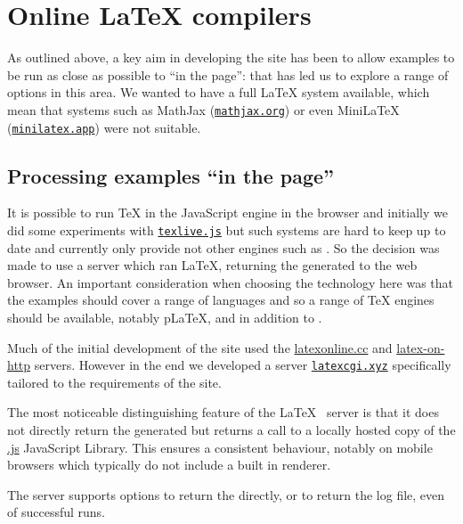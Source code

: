 \documentclass[harvardcite]{ltugboat}
\begin{document}
\section{Online \LaTeX{} compilers}

As outlined above, a key aim in developing the site has been to allow examples
to be run as close as possible to \enquote{in the page}: that has led us to
explore a range of options in this area. We wanted to have a full \LaTeX{}
system available, which mean that systems such as MathJax (\href{https://mathjax.org}{\nolinkurl{mathjax.org}})
or even Mini\LaTeX{} (\href{https://minilatex.app}{\nolinkurl{minilatex.app}}) were not suitable.

\subsection{Processing examples \enquote{in the page}}

It is possible to run \TeX{} in the JavaScript engine in the browser and
initially we did some experiments with
\href{https://github.com/manuels/texlive.js/}{\texttt{texlive.js}} but
such systems are hard to keep up to date and currently only provide
 not other engines such as . So the decision was
made to use a server which ran \LaTeX{}, returning the generated 
to the web browser.  An important consideration when choosing the
technology here was that the examples should cover a range of
languages and so a range of \TeX{} engines should be available,
notably p\LaTeX{},  and  in addition to
.

Much of the initial development of the site used the
\href{https://latexonline.cc}{latexonline.cc}
and
\href{https://latex.ytotech.com/}{latex-on-http}
servers. However in
the end we developed a server
\href{https://latexcgi.xyz}{\nolinkurl{latexcgi.xyz}}
specifically tailored to the
requirements of the site.

The most noticeable distinguishing feature of the \LaTeX{}~ server
is that it does not directly return the generated  but returns a
call to a locally hosted copy of the
\href{https://mozilla.github.io/pdf.js/}{.js}
JavaScript Library. This ensures a consistent behaviour, notably on
mobile browsers which typically do not include a built in 
renderer.

The server supports options to return the  directly, or to return
the log file, even of successful runs.
\end{document}
